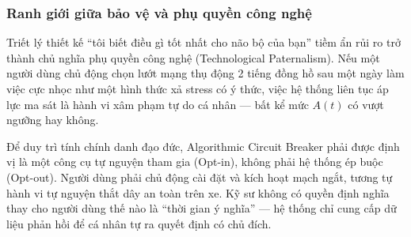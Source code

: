 \subsubsection{Ranh giới giữa bảo vệ và phụ quyền công nghệ}

Triết lý thiết kế ``tôi biết điều gì tốt nhất cho não bộ của bạn'' tiềm ẩn rủi ro trở thành chủ nghĩa phụ quyền công nghệ (Technological Paternalism). Nếu một người dùng chủ động chọn lướt mạng thụ động 2 tiếng đồng hồ sau một ngày làm việc cực nhọc như một hình thức xả stress có ý thức, việc hệ thống liên tục áp lực ma sát là hành vi xâm phạm tự do cá nhân — bất kể mức $A(t)$ có vượt ngưỡng hay không.

Để duy trì tính chính danh đạo đức, Algorithmic Circuit Breaker phải được định vị là một công cụ tự nguyện tham gia (Opt-in), không phải hệ thống ép buộc (Opt-out). Người dùng phải chủ động cài đặt và kích hoạt mạch ngắt, tương tự hành vi tự nguyện thắt dây an toàn trên xe. Kỹ sư không có quyền định nghĩa thay cho người dùng thế nào là ``thời gian ý nghĩa'' — hệ thống chỉ cung cấp dữ liệu phản hồi để cá nhân tự ra quyết định có chủ đích.
